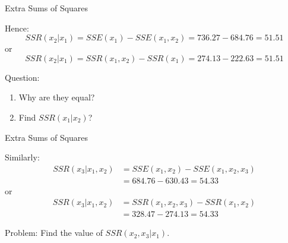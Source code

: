 \documentclass[
  ignorenonframetext,
]{beamer}
\providecommand{\tightlist}{%
  \setlength{\itemsep}{0pt}\setlength{\parskip}{0pt}}
\begin{document}
\begin{frame}{Extra Sums of Squares}
\protect\hypertarget{extra-sums-of-squares-2}{}
\begin{table}[h]
\centering
{}
\end{table}

Hence: \[SSR(x_2|x_1)=SSE(x_1)-SSE(x_1, x_2)=736.27-684.76=51.51\] or
\[SSR(x_2|x_1)=SSR(x_1,x_2)-SSR(x_1)=274.13-222.63=51.51\]

Question:

\begin{enumerate}
\tightlist
\item
  Why are they equal?
\item
  Find \(SSR(x_1|x_2)\)?
\end{enumerate}
\end{frame}

\begin{frame}{Extra Sums of Squares}
\protect\hypertarget{extra-sums-of-squares-3}{}
\begin{table}[h]
\centering
{}
\end{table}

Similarly:
\[\begin{array}{ll}SSR(x_3|x_1,x_2)&=SSE(x_1,x_2)-SSE(x_1, x_2, x_3)\\
&=684.76-630.43=54.33\end{array}\] or
\[\begin{array}{ll}SSR(x_3|x_1,x_2)&=SSR(x_1,x_2,x_3)-SSR(x_1,x_2)\\
&=328.47-274.13=54.33\end{array}\]

Problem: Find the value of \(SSR(x_2,x_3|x_1)\).
\end{frame}
\end{document}
